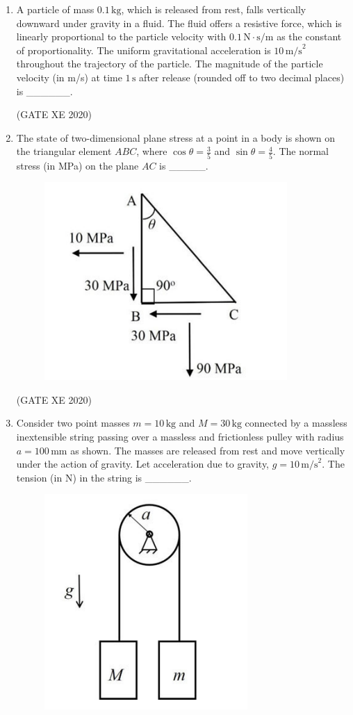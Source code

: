 \documentclass[12pt]{article}
\begin{document}
\begin{enumerate}
 \item A particle of mass $0.1\,\text{kg}$, which is released from rest, falls vertically downward under gravity in a fluid. The fluid offers a resistive force, which is linearly proportional to the particle velocity with $0.1\,\text{N}\!\cdot\!\text{s/m}$ as the constant of proportionality. The uniform gravitational acceleration is $10\,\text{m/s}^2$ throughout the trajectory of the particle. The magnitude of the particle velocity (in m/s) at time $1\,\text{s}$ after release (rounded off to two decimal places) is \_\_\_\_\_\_.
 
(GATE XE 2020)

\item The state of two-dimensional plane stress at a point in a body is shown on the triangular element $ABC$, where $\cos\theta=\tfrac{3}{5}$ and $\sin\theta=\tfrac{4}{5}$. The normal stress (in MPa) on the plane $AC$ is \_\_\_\_\_. 

\begin{figure}[H]
    \centering
    \includegraphics[width=0.5\columnwidth]{figs/ass4_d_q8.png}
    \caption{}
    \label{fig:placeholder}
\end{figure}

(GATE XE 2020)

\item Consider two point masses $m=10\,\text{kg}$ and $M=30\,\text{kg}$ connected by a massless inextensible string passing over a massless and frictionless pulley with radius $a=100\,\text{mm}$ as shown. The masses are released from rest and move vertically under the action of gravity. Let acceleration due to gravity, $g=10\,\text{m/s}^2$. The tension (in N) in the string is \_\_\_\_\_\_. 

\begin{figure}[H]
    \centering
    \includegraphics[width=0.5\columnwidth]{figs/ass4_d_q9.png}
    \caption{}
    \label{fig:placeholder}
\end{figure}


\end{enumerate}
\end{document}

